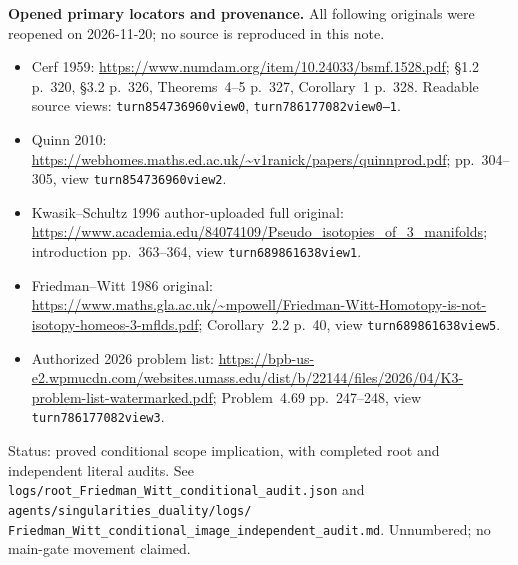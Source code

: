 \textbf{Opened primary locators and provenance.}\quad
All following originals were reopened on 2026-11-20; no source is
reproduced in this note.
\begin{itemize}
\item Cerf 1959: \url{https://www.numdam.org/item/10.24033/bsmf.1528.pdf};
  \S1.2 p.~320, \S3.2 p.~326, Theorems~4--5 p.~327,
  Corollary~1 p.~328. Readable source views:
  \texttt{turn854736960view0}, \texttt{turn786177082view0--1}.
\item Quinn 2010:
  \url{https://webhomes.maths.ed.ac.uk/~v1ranick/papers/quinnprod.pdf};
  pp.~304--305, view \texttt{turn854736960view2}.
\item Kwasik--Schultz 1996 author-uploaded full original:
  \url{https://www.academia.edu/84074109/Pseudo_isotopies_of_3_manifolds};
  introduction pp.~363--364, view \texttt{turn689861638view1}.
\item Friedman--Witt 1986 original:
  \url{https://www.maths.gla.ac.uk/~mpowell/Friedman-Witt-Homotopy-is-not-isotopy-homeos-3-mflds.pdf};
  Corollary~2.2 p.~40, view \texttt{turn689861638view5}.
\item Authorized 2026 problem list:
  \url{https://bpb-us-e2.wpmucdn.com/websites.umass.edu/dist/b/22144/files/2026/04/K3-problem-list-watermarked.pdf};
  Problem~4.69 pp.~247--248, view \texttt{turn786177082view3}.
\end{itemize}

Status: proved conditional scope implication, with completed root and
independent literal audits. See
\texttt{logs/root\_Friedman\_Witt\_conditional\_audit.json} and
\texttt{agents/singularities\_duality/logs/}
\texttt{Friedman\_Witt\_conditional\_image\_independent\_audit.md}.
Unnumbered; no main-gate movement claimed.
